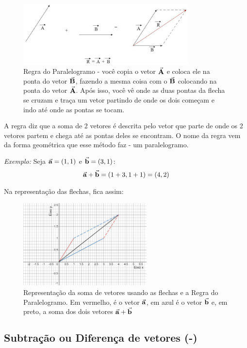 \documentclass[12pt]{extarticle}
\newcommand{\<}{\langle}
\renewcommand{\>}{\rangle}
\theoremstyle{definition}
\begin{document}
\begin{figure}[H]
    \centering
    \includegraphics[width=0.8\textwidth]{5863e9ecd787d-vetores.jpg}
    \caption{Regra do Paralelogramo - você copia o vetor $\va{A}$ e coloca ele na ponta do vetor $\va{B}$, fazendo a mesma coisa com o $\va{B}$ colocando na ponta do vetor $\va{A}$. Após isso, você vê onde as duas pontas da flecha se cruzam e traça um vetor partindo de onde os dois começam e indo até onde as pontas se tocam.}
    \label{fig:sum_vectors}
\end{figure}

A regra diz que a soma de 2 vetores é descrita pelo vetor que parte de onde os 2 vetores partem e chega até as pontas deles se encontram. O nome da regra vem da forma geométrica que esse método faz - um paralelogramo.

\textit{Exemplo:} Seja $\va{a} = (1,1)$ e $\va{b} = (3,1)$:
\begin{equation}
    \va{a} + \va{b} = (1+3,1+1) = (4,2)
\end{equation}

Na representação das flechas, fica assim:
\begin{figure}[H]
    \centering
    \includegraphics[width=0.6\textwidth]{sum_vectors.png}
    \caption{Representação da soma de vetores usando as flechas e a Regra do Paralelogramo. Em vermelho, é o vetor $\va{a}$, em azul é o vetor $\va{b}$ e, em preto, a soma dos dois vetores $\va{a} + \va{b}$}
    \label{fig:sum_vectors}
\end{figure}

\subsection{Subtração ou Diferença de vetores (-)}
\end{document}
